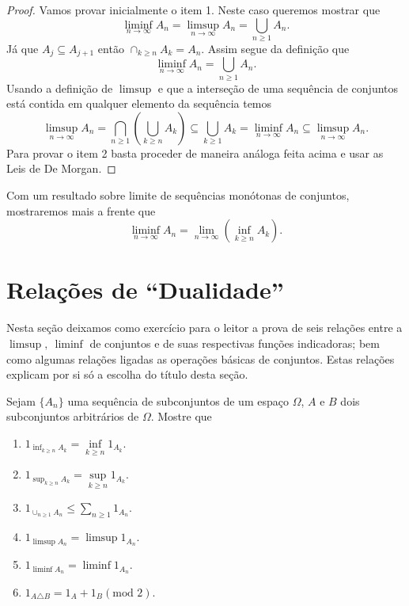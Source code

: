 \begin{proof}
Vamos provar inicialmente o item 1. 
Neste caso queremos mostrar que 
%
\[
	\liminf_{n\to\infty} A_n
	= 
	\limsup_{n\to\infty} A_n
	=
	\displaystyle\bigcup_{n\geqslant 1} {A_n}.
\] 
%
Já que $A_j \subseteq A_{j+1}$
então $\cap_{k\geqslant n} {A_k}=A_n$.
Assim segue da definição que 
\[
\liminf_{n\to\infty} A_n 
= 
\bigcup_{n\geqslant 1} {A_n}.
\]
Usando a definição de $\limsup$ e que a interseção de 
uma sequência de conjuntos
está contida em qualquer elemento da sequência temos 
\[
	\limsup_{n\to\infty} A_n 
	=
	\displaystyle\bigcap_{n\geqslant 1} 
		\left(\displaystyle\bigcup_{k\geqslant n}{A_k} \right)
	\subseteq 
	\displaystyle\bigcup_{k\geqslant 1} {A_k} 
	=
	\liminf_{n\to\infty} A_n 
	\subseteq 
	\limsup_{n\to\infty} A_n.
\]
Para provar o item 2 basta proceder de maneira análoga feita acima 
e usar as Leis de De Morgan.
\end{proof}







\begin{exercicio}
Com um resultado sobre limite de sequências monótonas de conjuntos, 
mostraremos mais a frente que
		 \[
		 	\liminf \limits_{n\to \infty}A_n 
			=
			\lim \limits_{n\to \infty}\left(\inf \limits_{k\geqslant n}A_k \right).
		 \]
\end{exercicio}






\section{Relações de ``Dualidade''}

Nesta seção deixamos como exercício para o leitor a prova de
seis relações 
entre a $\limsup,\ \liminf$ de conjuntos e de suas respectivas 
funções indicadoras; bem como algumas relações ligadas as operações
básicas de conjuntos. Estas relações explicam por si só a escolha 
do título desta seção. 

\begin{exercicio}
Sejam $\{A_n\}$ uma sequência de subconjuntos de um espaço $\Omega$, 
$A$ e $B$ dois subconjuntos arbitrários de $\Omega$. Mostre que 
\begin{enumerate}
\item 
$1_{\inf_{k\geqslant n} A_k} = \inf \limits_{k\geqslant n} 1_{A_k}$.

\item
$1_{\sup_{k\geqslant n} A_k} = \sup \limits_{k\geqslant n} 1_{A_k}$.

\item
$1_{\cup_{n\geqslant 1} A_n} 
\leqslant 
\sum \limits_{n \geqslant 1} 1_{A_n}$.

\item
$1_{\limsup A_n} = \limsup 1_{A_n}$.

\item
$1_{\liminf A_n} = \liminf 1_{A_n}$.

\item
$ 1_{A \triangle B} = 1_A + 1_B (\text{mod 2})$.
\end{enumerate}
\end{exercicio}

